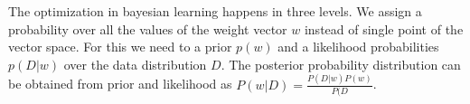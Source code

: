 The optimization in bayesian learning happens in three levels. We assign a probability over all the values of the weight vector $w$ instead of single point of the vector space. For this we need to a prior $p(w)$ and a likelihood                                                                                                                                                                                                                                                                                                                                                                                                                                                                                                                                                                                                                                                                                                                                                                                                                                                                                                                                                                                                                                                                                                                                                                                                                                                                                                                                                                                                                                                                                                                                                                                                                                                                                                                                                                                                                                                                                                                                                                                                                                                                                                                                                                                                                                                                                                                                                                                                                                                                                                                                                                                                                                                                                                                                                                                                                                        probabilities $p(D|w)$ over the data distribution $D$. The posterior probability distribution  can be obtained from prior and likelihood as $P(w|D)=\frac{P(D|w)P(w)}{P(D}$.

